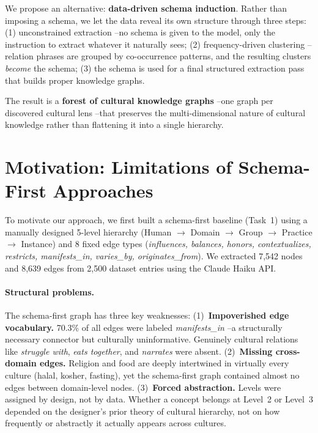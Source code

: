 \documentclass[11pt]{article}
\begin{document}
We propose an alternative: \textbf{data-driven schema induction}.
Rather than imposing a schema, we let the data reveal its own structure
through three steps: (1) unconstrained extraction --no schema is given
to the model, only the instruction to extract whatever it naturally sees;
(2) frequency-driven clustering --relation phrases are grouped by
co-occurrence patterns, and the resulting clusters \emph{become} the
schema; (3) the schema is used for a final structured extraction pass
that builds proper knowledge graphs.

The result is a \textbf{forest of cultural knowledge graphs} --one graph
per discovered cultural lens --that preserves the multi-dimensional
nature of cultural knowledge rather than flattening it into a single
hierarchy.

\section{Motivation: Limitations of Schema-First Approaches}
\label{sec:motivation}

To motivate our approach, we first built a schema-first baseline (Task~1)
using a manually designed 5-level hierarchy
(Human $\to$ Domain $\to$ Group $\to$ Practice $\to$ Instance) and
8 fixed edge types (\emph{influences, balances, honors, contextualizes,
restricts, manifests\_in, varies\_by, originates\_from}).
We extracted 7,542 nodes and 8,639 edges from 2,500 dataset entries
using the Claude Haiku API.

\paragraph{Structural problems.}
The schema-first graph has three key weaknesses:
(1)~\textbf{Impoverished edge vocabulary.} 70.3\% of all edges were labeled
\emph{manifests\_in} --a structurally necessary connector but culturally
uninformative. Genuinely cultural relations like \emph{struggle with},
\emph{eats together}, and \emph{narrates} were absent.
(2)~\textbf{Missing cross-domain edges.} Religion and food are deeply
intertwined in virtually every culture (halal, kosher, fasting), yet the
schema-first graph contained almost no edges between domain-level nodes.
(3)~\textbf{Forced abstraction.} Levels were assigned by design, not by
data. Whether a concept belongs at Level~2 or Level~3 depended on the
designer's prior theory of cultural hierarchy, not on how frequently or
abstractly it actually appears across cultures.
\end{document}
